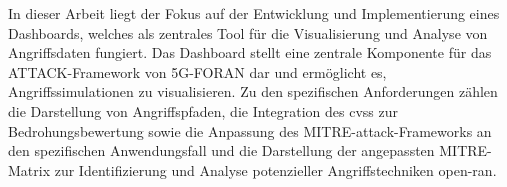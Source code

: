 \par
In dieser Arbeit liegt der Fokus auf der Entwicklung und Implementierung eines Dashboards, welches als zentrales Tool für die Visualisierung und Analyse von Angriffsdaten fungiert. Das Dashboard stellt eine zentrale Komponente für das ATTACK-Framework von 5G-FORAN dar und ermöglicht es, Angriffssimulationen zu visualisieren. Zu den spezifischen Anforderungen zählen die Darstellung von Angriffspfaden, die Integration des \gls{cvss} zur Bedrohungsbewertung sowie die Anpassung des MITRE-\gls{attack}-Frameworks an den spezifischen Anwendungsfall und die Darstellung der angepassten MITRE-Matrix zur Identifizierung und Analyse potenzieller Angriffstechniken  \gls{open-ran}\cite{dieterichDevelopmentAdversarySimulation}.